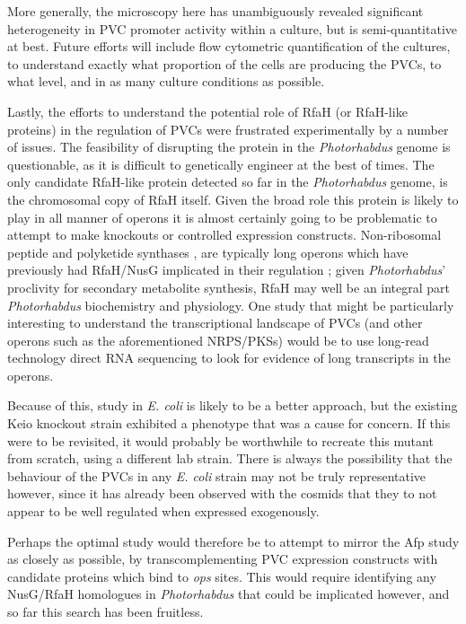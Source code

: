 More generally, the microscopy here has unambiguously revealed significant heterogeneity in PVC promoter activity within a culture, but is semi-quantitative at best. Future efforts will include flow cytometric quantification of the cultures, to understand exactly what proportion of the cells are producing the PVCs, to what level, and in as many culture conditions as possible.

Lastly, the efforts to understand the potential role of RfaH (or RfaH-like proteins) in the regulation of PVCs were frustrated experimentally by a number of issues. The feasibility of disrupting the protein in the \emph{Photorhabdus} genome is questionable, as it is difficult to genetically engineer at the best of times. The only candidate RfaH-like protein detected so far in the \emph{Photorhabdus} genome, is the chromosomal copy of RfaH itself. Given the broad role this protein is likely to play in all manner of operons it is almost certainly going to be problematic to attempt to make knockouts or controlled expression constructs. Non-ribosomal peptide and polyketide synthases \citep{Challinor2015}, are typically long operons which have previously had RfaH/NusG implicated in their regulation \citep{Goodson2017}; given \emph{Photorhabdus}' proclivity for secondary metabolite synthesis, RfaH may well be an integral part \emph{Photorhabdus} biochemistry and physiology. One study that might be particularly interesting to understand the transcriptional landscape of PVCs (and other operons such as the aforementioned NRPS/PKSs) would be to use long-read technology direct RNA sequencing to look for evidence of long transcripts in the operons.

Because of this, study in \emph{E. coli} is likely to be a better approach, but the existing Keio knockout strain exhibited a phenotype that was a cause for concern. If this were to be revisited, it would probably be worthwhile to recreate this mutant from scratch, using a different lab strain. There is always the possibility that the behaviour of the PVCs in any \emph{E. coli} strain may not be truly representative however, since it has already been observed with the cosmids that they to not appear to be well regulated when expressed exogenously.

Perhaps the optimal study would therefore be to attempt to mirror the Afp study as closely as possible, by transcomplementing PVC expression constructs with candidate proteins which bind to \emph{ops} sites. This would require identifying any NusG/RfaH homologues in \emph{Photorhabdus} that could be implicated however, and so far this search has been fruitless.



